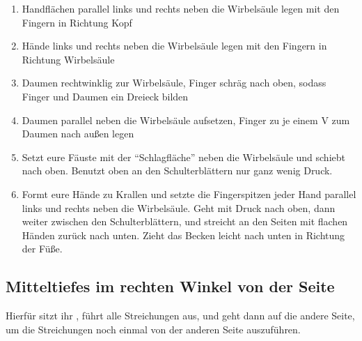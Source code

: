 \begin{enumerate}
  \item {} Handflächen parallel links und rechts neben die Wirbelsäule legen mit den Fingern in Richtung Kopf
  \item {} Hände links und rechts neben die Wirbelsäule legen mit den Fingern in Richtung Wirbelsäule
  \item {} Daumen rechtwinklig zur Wirbelsäule, Finger schräg nach oben, sodass Finger und Daumen ein Dreieck bilden
  \item {} Daumen parallel neben die Wirbelsäule aufsetzen, Finger zu je einem V zum Daumen nach außen legen
  \item {} Setzt eure Fäuste mit der ``Schlagfläche'' neben die Wirbelsäule und schiebt nach oben. Benutzt oben an den Schulterblättern nur ganz wenig Druck.
  \item {} Formt eure Hände zu Krallen und setzte die Fingerspitzen jeder Hand parallel links und rechts neben die Wirbelsäule. Geht mit Druck nach oben, dann weiter zwischen den Schulterblättern, und streicht an den Seiten mit flachen Händen zurück nach unten. Zieht das Becken leicht nach unten in Richtung der Füße.
\end{enumerate}


\subsection{Mitteltiefes im rechten Winkel von der Seite}
Hierfür sitzt ihr , führt alle Streichungen aus, und geht dann auf die andere Seite, um die Streichungen noch einmal von der anderen Seite auszuführen.

